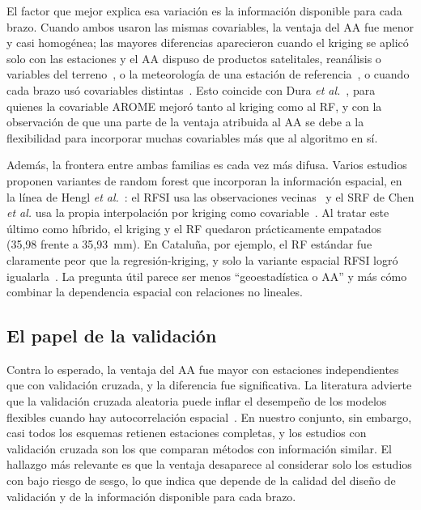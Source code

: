 \documentclass[conference]{IEEEtran}
\begin{document}
El factor que mejor explica esa variación es la información disponible para cada brazo. Cuando ambos usaron las mismas covariables, la ventaja del AA fue menor y casi homogénea; las mayores diferencias aparecieron cuando el kriging se aplicó solo con las estaciones y el AA dispuso de productos satelitales, reanálisis o variables del terreno~\cite{chen2021,he2025}, o la meteorología de una estación de referencia~\cite{li2026}, o cuando cada brazo usó covariables distintas~\cite{husrevoglu2025}. Esto coincide con Dura \textit{et al.}~\cite{dura2024}, para quienes la covariable AROME mejoró tanto al kriging como al RF, y con la observación de que una parte de la ventaja atribuida al AA se debe a la flexibilidad para incorporar muchas covariables más que al algoritmo en sí.

Además, la frontera entre ambas familias es cada vez más difusa. Varios estudios proponen variantes de random forest que incorporan la información espacial, en la línea de Hengl \textit{et al.}~\cite{hengl2018}: el RFSI usa las observaciones vecinas~\cite{sekulic2020} y el SRF de Chen \textit{et al.} usa la propia interpolación por kriging como covariable~\cite{chen2021}. Al tratar este último como híbrido, el kriging y el RF quedaron prácticamente empatados (35,98 frente a 35,93~mm). En Cataluña, por ejemplo, el RF estándar fue claramente peor que la regresión-kriging, y solo la variante espacial RFSI logró igualarla~\cite{sekulic2020}. La pregunta útil parece ser menos ``geoestadística o AA'' y más cómo combinar la dependencia espacial con relaciones no lineales.

\subsection{El papel de la validación}
Contra lo esperado, la ventaja del AA fue mayor con estaciones independientes que con validación cruzada, y la diferencia fue significativa. La literatura advierte que la validación cruzada aleatoria puede inflar el desempeño de los modelos flexibles cuando hay autocorrelación espacial~\cite{roberts2017,ploton2020}. En nuestro conjunto, sin embargo, casi todos los esquemas retienen estaciones completas, y los estudios con validación cruzada son los que comparan métodos con información similar. El hallazgo más relevante es que la ventaja desaparece al considerar solo los estudios con bajo riesgo de sesgo, lo que indica que depende de la calidad del diseño de validación y de la información disponible para cada brazo.
\end{document}
